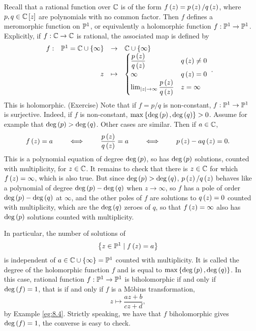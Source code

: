 \begin{example}
Recall that a rational function over $ \C $ is of the form $ f\rb{z} = p\rb{z} / q\rb{z} $, where $ p, q \in \C\sb{z} $ are polynomials with no common factor. Then $ f $ defines a meromorphic function on $ \P^1 $, or equivalently a holomorphic function $ f : \P^1 \to \P^1 $. Explicitly, if $ f : \C \to \C $ is rational, the associated map is defined by
$$ \function[f]{\P^1 = \C \cup \cb{\infty}}{\C \cup \cb{\infty}}{z}{
\begin{cases}
\dfrac{p\rb{z}}{q\rb{z}} & q\rb{z} \ne 0 \\
\infty & q\rb{z} = 0 \\
\lim_{\abs{z} \to \infty} \dfrac{p\rb{z}}{q\rb{z}} & z = \infty
\end{cases}
}. $$
This is holomorphic. (Exercise) Note that if $ f = p / q $ is non-constant, $ f : \P^1 \to \P^1 $ is surjective. Indeed, if $ f $ is non-constant, $ \max\cb{\deg\rb{p}, \deg\rb{q}} > 0 $. Assume for example that $ \deg\rb{p} > \deg\rb{q} $. Other cases are similar. Then if $ a \in \C $,
$$ f\rb{z} = a \qquad \iff \qquad \dfrac{p\rb{z}}{q\rb{z}} = a \qquad \iff \qquad p\rb{z} - aq\rb{z} = 0. $$
This is a polynomial equation of degree $ \deg\rb{p} $, so has $ \deg\rb{p} $ solutions, counted with multiplicity, for $ z \in \C $. It remains to check that there is $ z \in \C $ for which $ f\rb{z} = \infty $, which is also true. But since $ \deg\rb{p} > \deg\rb{q} $, $ p\rb{z} / q\rb{z} $ behaves like a polynomial of degree $ \deg\rb{p} - \deg\rb{q} $ when $ z \to \infty $, so $ f $ has a pole of order $ \deg\rb{p} - \deg\rb{q} $ at $ \infty $, and the other poles of $ f $ are solutions to $ q\rb{z} = 0 $ counted with multiplicity, which are the $ \deg\rb{q} $ zeroes of $ q $, so that $ f\rb{z} = \infty $ also has $ \deg\rb{p} $ solutions counted with multiplicity.
\end{example}

In particular, the number of solutions of
$$ \cb{z \in \P^1 \mid f\rb{z} = a} $$
is independent of $ a \in \C \cup \cb{\infty} = \P^1 $ counted with multiplicity. It is called the degree of the holomorphic function $ f $ and is equal to $ \max\cb{\deg\rb{p}, \deg\rb{q}} $. In this case, rational function $ f : \P^1 \to \P^1 $ is biholomorphic if and only if $ \deg\rb{f} = 1 $, that is if and only if $ f $ is a M\"obius transformation,
$$ z \mapsto \dfrac{az + b}{cz + d}, $$
by Example \ref{eg:8.4}. Strictly speaking, we have that $ f $ biholomorphic gives $ \deg\rb{f} = 1 $, the converse is easy to check.

